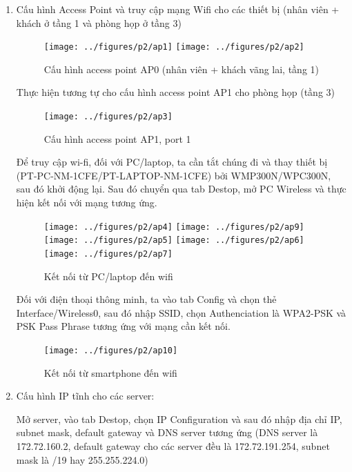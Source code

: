 \begin{enumerate}
\begin{enumerate}
\item Cấu hình Access Point và truy cập mạng Wifi cho các thiết bị (nhân viên + khách ở tầng 1 và phòng họp ở tầng 3)

\begin{figure}[H]
\begin{center}
\texttt{[image: ../figures/p2/ap1]}
\texttt{[image: ../figures/p2/ap2]}
\end{center}
\caption{Cấu hình access point AP0 (nhân viên + khách vãng lai, tầng 1)}
\end{figure}

Thực hiện tương tự cho cấu hình access point AP1 cho phòng họp (tầng 3)
\begin{figure}[H]
\begin{center}
\texttt{[image: ../figures/p2/ap3]}
\end{center}
\caption{Cấu hình access point AP1, port 1}
\end{figure}

Để truy cập wi-fi, đối với PC/laptop, ta cần tắt chúng đi và thay thiết bị (PT-PC-NM-1CFE/PT-LAPTOP-NM-1CFE) bởi WMP300N/WPC300N, sau đó khởi động lại. Sau đó chuyển qua tab Destop, mở PC Wireless và thực hiện kết nối với mạng tương ứng.

\begin{figure}[H]
\begin{center}
\texttt{[image: ../figures/p2/ap4]}
\texttt{[image: ../figures/p2/ap9]}
\texttt{[image: ../figures/p2/ap5]}
\texttt{[image: ../figures/p2/ap6]}
\texttt{[image: ../figures/p2/ap7]}
\end{center}
\caption{Kết nối từ PC/laptop đến wifi}
\end{figure}

Đối với điện thoại thông minh, ta vào tab Config và chọn thẻ Interface/Wireless0, sau đó nhập SSID, chọn Authenciation là WPA2-PSK và PSK Pass Phrase tương ứng với mạng cần kết nối.

\begin{figure}[H]
\begin{center}
\texttt{[image: ../figures/p2/ap10]}
\end{center}
\caption{Kết nối từ smartphone đến wifi}
\end{figure}

\item Cấu hình IP tĩnh cho các server:

Mở server, vào tab Destop, chọn IP Configuration và sau đó nhập địa chỉ IP, subnet mask, default gateway và DNS server tương ứng (DNS server là 172.72.160.2, default gateway cho các server đều là 172.72.191.254, subnet mask là /19 hay 255.255.224.0)


\end{enumerate}
\end{enumerate}

